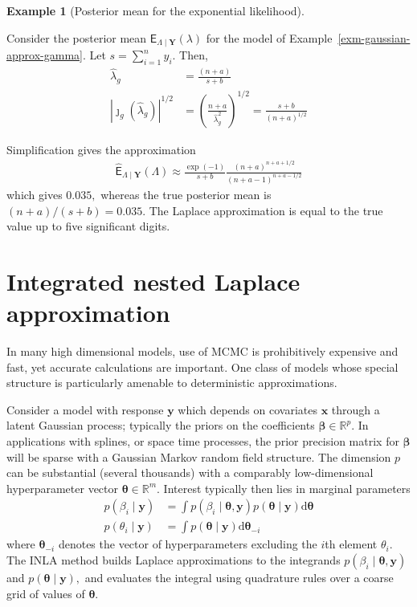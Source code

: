 \documentclass[
  11pt,
  letterpaper,
]{scrbook}
\theoremstyle{definition}
\newtheorem{example}{Example}[chapter]
\theoremstyle{plain}
\theoremstyle{plain}
\theoremstyle{plain}
\theoremstyle{definition}
\theoremstyle{definition}
\theoremstyle{plain}
\theoremstyle{plain}
\theoremstyle{remark}
\begin{document}
\begin{example}[Posterior mean for the exponential
likelihood]\protect\hypertarget{exm-posterior-gamma}{}\label{exm-posterior-gamma}

Consider the posterior mean
\(\mathsf{E}_{\Lambda \mid \boldsymbol{Y}}(\lambda)\) for the model of
Example~\ref{exm-gaussian-approx-gamma}. Let \(s=\sum_{i=1}^n y_i\).
Then, \begin{align*}
\widehat{\lambda}_g &= \frac{(n+a)}{s + b} \\
|\jmath_g(\widehat{\lambda}_g)|^{1/2} &= \left(\frac{n+a}{\widehat{\lambda}_g^2}\right)^{1/2} =  \frac{s + b}{(n+a)^{1/2}}
\end{align*}

Simplification gives the approximation \begin{align*}
\widehat{\mathsf{E}}_{\Lambda \mid \boldsymbol{Y}}(\Lambda) \approx \frac{\exp(-1)}{s + b} \frac{(n+a)^{n+a+1/2}}{(n+a-1)^{n+a-1/2}}
\end{align*} which gives \(0.035,\) whereas the true posterior mean is
\((n+a)/(s+b) = 0.035.\) The Laplace approximation is equal to the true
value up to five significant digits.

\end{example}

\section{Integrated nested Laplace
approximation}\label{integrated-nested-laplace-approximation}

In many high dimensional models, use of MCMC is prohibitively expensive
and fast, yet accurate calculations are important. One class of models
whose special structure is particularly amenable to deterministic
approximations.

Consider a model with response \(\boldsymbol{y}\) which depends on
covariates \(\mathbf{x}\) through a latent Gaussian process; typically
the priors on the coefficients \(\boldsymbol{\beta} \in \mathbb{R}^p.\)
In applications with splines, or space time processes, the prior
precision matrix for \(\boldsymbol{\beta}\) will be sparse with a
Gaussian Markov random field structure. The dimension \(p\) can be
substantial (several thousands) with a comparably low-dimensional
hyperparameter vector \(\boldsymbol{\theta} \in \mathbb{R}^m.\) Interest
typically then lies in marginal parameters \begin{align*}
p(\beta_i \mid \boldsymbol{y}) &= \int p(\beta_i \mid \boldsymbol{\theta}, \boldsymbol{y}) p(\boldsymbol{\theta} \mid \boldsymbol{y}) \mathrm{d} \boldsymbol{\theta}\\
p(\theta_i \mid \boldsymbol{y}) &= \int p(\boldsymbol{\theta} \mid \boldsymbol{y}) \mathrm{d} \boldsymbol{\theta}_{-i}
\end{align*} where \(\boldsymbol{\theta}_{-i}\) denotes the vector of
hyperparameters excluding the \(i\)th element \(\theta_i.\) The INLA
method builds Laplace approximations to the integrands
\(p(\beta_i \mid \boldsymbol{\theta}, \boldsymbol{y})\) and
\(p(\boldsymbol{\theta} \mid \boldsymbol{y}),\) and evaluates the
integral using quadrature rules over a coarse grid of values of
\(\boldsymbol{\theta}.\)
\end{document}
